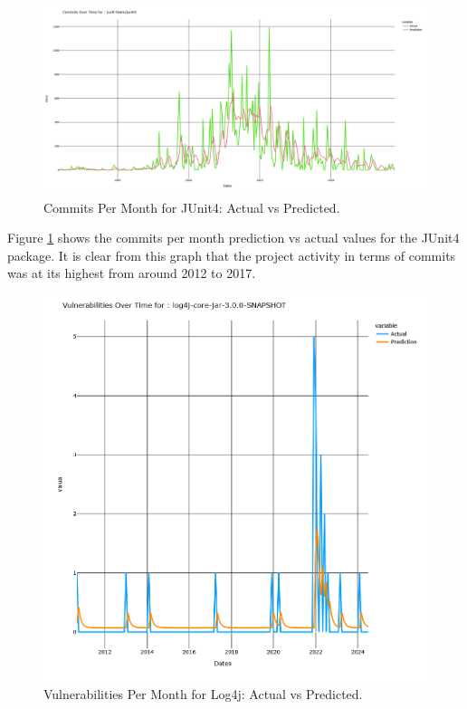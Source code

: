 \documentclass[conference]{IEEEtran}
\begin{document}
{\begin{figure}
    \centering
    \includegraphics[width=1\linewidth]{JUnit4commits.png}
    \caption{Commits Per Month for JUnit4: Actual vs Predicted.} 
    \label{fig:commits}
\end{figure}

Figure \ref{fig:commits} shows the commits per month prediction vs actual values for the JUnit4 package. It is clear from this graph that the project activity in terms of commits was at its highest from around 2012 to 2017. 

\begin{figure}
    \centering
    \includegraphics[width=1\linewidth]{Log4jVuls.png}
    \caption{Vulnerabilities Per Month for Log4j: Actual vs Predicted.} 
    \label{fig:vulns}
\end{figure}

}
\end{document}

